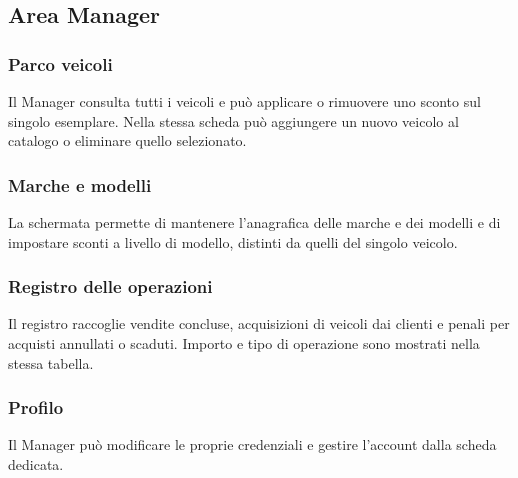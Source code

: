 \subsection{Area Manager}

\noindent\begin{minipage}{\linewidth}
\subsubsection{Parco veicoli}
Il Manager consulta tutti i veicoli e può applicare o rimuovere uno sconto sul singolo esemplare. Nella stessa scheda può aggiungere un nuovo veicolo al catalogo o eliminare quello selezionato.
\end{minipage}
\par\medskip
\noindent\begin{minipage}{\linewidth}
\subsubsection{Marche e modelli}
La schermata permette di mantenere l'anagrafica delle marche e dei modelli e di impostare sconti a livello di modello, distinti da quelli del singolo veicolo.
\end{minipage}
\clearpage
\noindent\begin{minipage}{\linewidth}
\subsubsection{Registro delle operazioni}
Il registro raccoglie vendite concluse, acquisizioni di veicoli dai clienti e penali per acquisti annullati o scaduti. Importo e tipo di operazione sono mostrati nella stessa tabella.
\end{minipage}
\par\medskip
\noindent\begin{minipage}{\linewidth}
\subsubsection{Profilo}
Il Manager può modificare le proprie credenziali e gestire l'account dalla scheda dedicata.
\end{minipage}
\clearpage

